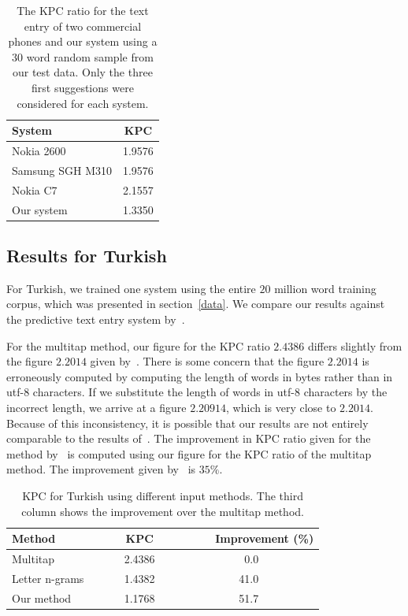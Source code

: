\documentclass{llncs}
\begin{document}
\begin{table}
\caption{The KPC ratio for the text entry of two commercial phones and
  our system using a $30$ word random sample from our test data. Only
  the three first suggestions were considered for each system.}\label{mobile-phone-kpc}
\begin{center}
\begin{tabular}{lc}
\hline
System & KPC\\
\hline
Nokia 2600       & 1.9576\\
Samsung SGH M310 & 1.9576\\
Nokia C7         & 2.1557\\
Our system       & 1.3350\\
\hline
\end{tabular}
\end{center}
\end{table}

\subsection{Results for Turkish}

For Turkish, we trained one system using the entire $20$ million word
training corpus, which was presented in section~\ref{data}. We compare
our results against the predictive text entry system
by~\cite{Tantug:2010}.

For the multitap method, our figure for the KPC ratio $2.4386$ differs
slightly from the figure $2.2014$ given by~\cite{Tantug:2010}. There
is some concern that the figure $2.2014$ is erroneously computed by
computing the length of words in bytes rather than in utf-8
characters. If we substitute the length of words in utf-8 characters
by the incorrect length, we arrive at a figure $2.20914$, which is
very close to $2.2014$. Because of this inconsistency, it is possible
that our results are not entirely comparable to the results
of~\cite{Tantug:2010}. The improvement in KPC ratio given for the method
by~\cite{Tantug:2010} is computed using our figure for the KPC ratio
of the multitap method. The improvement given by~\cite{Tantug:2010} is
$35\%$.

\begin{table}
\caption{KPC for Turkish using different input methods. The third
  column shows the improvement over the multitap method.}\label{Turkish-kpc-table}
\begin{center}
\begin{tabular}{lcr}
\hline
Method~~~~& ~~~~KPC~~~~ & ~~~~Improvement (\%)\\
\hline
Multitap                          &  2.4386 &0.0~~~~~~~~~~\\
Letter n-grams~\cite{Tantug:2010} &  1.4382 &41.0~~~~~~~~~~\\
Our method                        &  1.1768 &51.7~~~~~~~~~~\\
\hline
\end{tabular}
\end{center}
\end{table}
\end{document}
